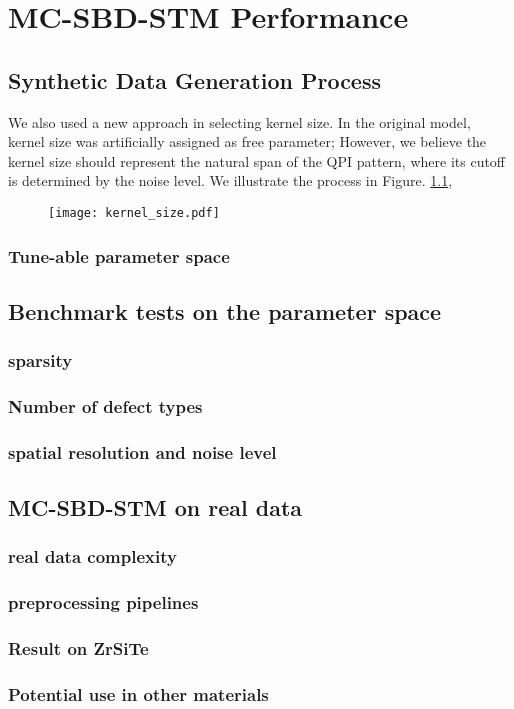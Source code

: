 \chapter{MC-SBD-STM Performance}

\section{Synthetic Data Generation Process}
We also used a new approach in selecting kernel size. In the original model, kernel size was artificially assigned as free parameter; However, we believe the kernel size should represent the natural span of the QPI pattern, where its cutoff is determined by the noise level. We illustrate the process in Figure. \ref{fig:ch7_kernel_size}, 

\begin{figure}
	\texttt{[image: kernel\_size.pdf]} 
	\centering
	\caption{}
	\label{fig:ch7_kernel_size}
\end{figure}
\subsection{Tune-able parameter space}

\section{Benchmark tests on the parameter space}
\subsection{sparsity}
\subsection{Number of defect types}
\subsection{spatial resolution and noise level}

\section{MC-SBD-STM on real data}
\subsection{real data complexity}
\subsection{preprocessing pipelines}
\subsection{Result on ZrSiTe}
\subsection{Potential use in other materials}
